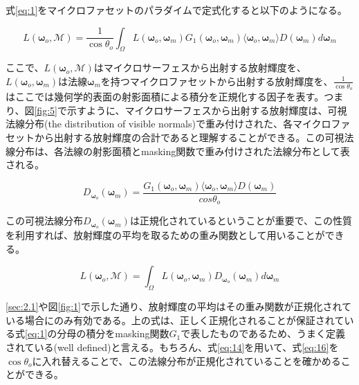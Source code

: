 \documentclass[a4j,xelatex,ja=standard]{bxjsarticle}
\begin{document}
式\eqref{eq:1}をマイクロファセットのパラダイムで定式化すると以下のようになる。

\begin{equation}
    L(\boldsymbol{\omega}_o, \mathcal{M}) = \frac{1}{\cos\theta_o} \int_\Omega L(\boldsymbol{\omega}_o, \boldsymbol{\omega}_m) G_1(\boldsymbol{\omega}_o, \boldsymbol{\omega}_m) \langle \boldsymbol{\omega}_o, \boldsymbol{\omega}_m \rangle D(\boldsymbol{\omega}_m) d\boldsymbol{\omega}_m
    \label{eq:15}
\end{equation}

ここで、$L(\boldsymbol{\omega}_o, \mathcal{M})$はマイクロサーフェスから出射する放射輝度を、$L(\boldsymbol{\omega}_o, \boldsymbol{\omega}_m)$は法線$\boldsymbol{\omega}_m$を持つマイクロファセットから出射する放射輝度を、$\frac{1}{\cos\theta_o}$はここでは幾何学的表面の射影面積による積分を正規化する因子を表す。つまり、図\ref{fig:5}で示すように、マイクロサーフェスから出射する放射輝度は、可視法線分布(the distribution of visible normals)で重み付けされた、各マイクロファセットから出射する放射輝度の合計であると理解することができる。この可視法線分布は、各法線の射影面積とmasking関数で重み付けされた法線分布として表される。

\begin{equation}
    D_{\boldsymbol{\omega}_o}(\boldsymbol{\omega}_m) = \frac{G_1(\boldsymbol{\omega}_o, \boldsymbol{\omega}_m) \langle \boldsymbol{\omega}_o, \boldsymbol{\omega}_m \rangle D(\boldsymbol{\omega}_m)}{cos\theta_o}
    \label{eq:16}
\end{equation}

この可視法線分布$D_{\boldsymbol{\omega}_o}(\boldsymbol{\omega}_m)$は正規化されているということが重要で、この性質を利用すれば、放射輝度の平均を取るための重み関数として用いることができる。

\begin{equation}
    L(\boldsymbol{\omega}_o, \mathcal{M}) = \int_\Omega L(\boldsymbol{\omega}_o, \boldsymbol{\omega}_m) D_{\boldsymbol{\omega}_o}(\boldsymbol{\omega}_m) d\boldsymbol{\omega}_m
    \label{eq:17}
\end{equation}

\ref{sec:2.1}や図\ref{fig:1}で示した通り、放射輝度の平均はその重み関数が正規化されている場合にのみ有効である。上の式は、正しく正規化されることが保証されている式\eqref{eq:1}の分母の積分をmasking関数$G_1$で表したものであるため、うまく定義されている(well defined)と言える。もちろん、式\eqref{eq:14}を用いて、式\eqref{eq:16}を$\cos\theta_o$に入れ替えることで、この法線分布が正規化されていることを確かめることができる。
\end{document}
